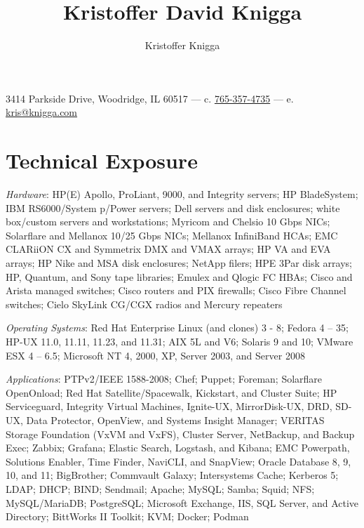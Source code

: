 \documentclass[9pt]{extarticle} %
\title{Kristoffer David Knigga}
\author{Kristoffer Knigga}
\begin{document}



3414 Parkside Drive, Woodridge, IL 60517 \hfill --- \hfill c. \href{tel:765-357-4735}{765-357-4735} \hfill --- \hfill e. \href{mailto:kris@knigga.com}{kris@knigga.com}


\section{Technical Exposure}

\textit{Hardware}: HP(E) Apollo, ProLiant, 9000, and Integrity servers; HP BladeSystem; IBM RS6000/System p/Power servers; Dell servers and disk enclosures; white box/custom servers and workstations; Myricom and Chelsio 10 Gbps NICs; Solarflare and Mellanox 10/25 Gbps NICs; Mellanox InfiniBand HCAs; EMC CLARiiON CX and Symmetrix DMX and VMAX arrays; HP VA and EVA arrays; HP Nike and MSA disk enclosures; NetApp filers; HPE 3Par disk arrays; HP, Quantum, and Sony tape libraries; Emulex and Qlogic FC HBAs; Cisco and Arista managed switches; Cisco routers and PIX firewalls; Cisco Fibre Channel switches; Cielo SkyLink CG/CGX radios and Mercury repeaters
\bigskip

\textit{Operating Systems}: Red Hat Enterprise Linux (and clones) 3 - 8; Fedora 4 -- 35; HP-UX 11.0, 11.11, 11.23, and 11.31; AIX 5L and V6; Solaris 9 and 10; VMware ESX 4 -- 6.5; Microsoft NT 4, 2000, XP, Server 2003, and Server 2008

\bigskip

\textit{Applications}: PTPv2/IEEE 1588-2008; Chef; Puppet; Foreman; Solarflare OpenOnload; Red Hat Satellite/Spacewalk, Kickstart, and Cluster Suite; HP Serviceguard, Integrity Virtual Machines, Ignite-UX, MirrorDisk-UX, DRD, SD-UX, Data Protector, OpenView, and Systems Insight Manager; VERITAS Storage Foundation (VxVM and VxFS), Cluster Server, NetBackup, and Backup Exec; Zabbix; Grafana; Elastic Search, Logstash, and Kibana; EMC Powerpath, Solutions Enabler, Time Finder, NaviCLI, and SnapView; Oracle Database 8, 9, 10, and 11; BigBrother; Commvault Galaxy; Intersystems Cache; Kerberos 5; LDAP; DHCP; BIND; Sendmail; Apache; MySQL; Samba; Squid; NFS; MySQL/MariaDB; PostgreSQL; Microsoft Exchange, IIS, SQL Server, and Active Directory; BittWorks II Toolkit; KVM; Docker; Podman
\end{document}
